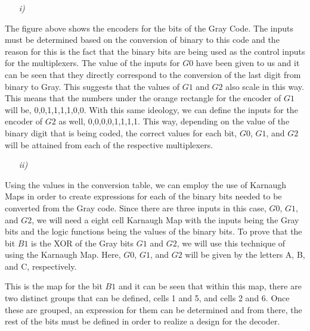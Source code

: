 \documentclass[12pt]{article}
\begin{document}
\begin{itemize}
    \item[\textit{i)}]
\end{itemize}
\par The figure above shows the encoders for the bits of the Gray Code. The
inputs must be determined based on the conversion of binary to this code and the
reason for this is the fact that the binary bits are being used as the control
inputs for the multiplexers. The value of the inputs for $G0$ have been given to
us and it can be seen that they directly correspond to the conversion of the
last digit from binary to Gray. This suggests that the values of $G1$ and $G2$
also scale in this way. This means that the numbers under the orange rectangle
for the encoder of $G1$ will be, 0,0,1,1,1,1,0,0. With this same ideology, we
can define the inputs for the encoder of $G2$ as well, 0,0,0,0,1,1,1,1. This
way, depending on the value of the binary digit that is being coded, the correct
values for each bit, $G0$, $G1$, and $G2$ will be attained from each of the
respective multiplexers.
\begin{itemize}
    \item[\textit{ii)}]
\end{itemize}
\par Using the values in the conversion table, we can employ the use of Karnaugh
Maps in order to create expressions for each of the binary bits needed to be
converted from the Gray code. Since there are three inputs in this case, $G0$,
$G1$, and $G2$, we will need a eight cell Karnaugh Map with the inputs being the
Gray bits and the logic functions being the values of the binary bits. To prove
that the bit $B1$ is the XOR of the Gray bits $G1$ and $G2$, we will use this
technique of using the Karnaugh Map. Here, $G0$, $G1$, and $G2$ will be given by
the letters A, B, and C, respectively.
\begin{center}
\end{center}
\par This is the map for the bit $B1$ and it can be seen that within this map,
there are two distinct groups that can be defined, cells 1 and 5, and cells 2
and 6. Once these are grouped, an expression for them can be determined and from
there, the rest of the bits must be defined in order to realize a design for the
decoder.
\begin{center}
\end{center}
\end{document}
